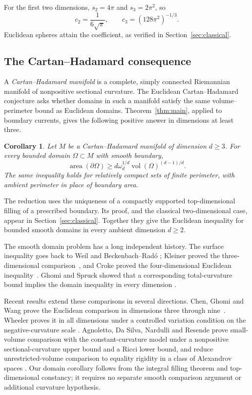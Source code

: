 \documentclass[11pt]{article}
\numberwithin{equation}{section}
\newtheorem{corollary}[theorem]{Corollary}
\theoremstyle{definition}
\theoremstyle{remark}
\begin{document}
For the first two dimensions, $s_2=4\pi$ and $s_3=2\pi^2$, so
\[
 c_2=\frac1{6\sqrt\pi},\qquad
 c_3=(128\pi^2)^{-1/3}.
\]
Euclidean spheres attain the coefficient, as verified in
Section~\ref{sec:classical}.

\subsection{The Cartan--Hadamard consequence}

A \emph{Cartan--Hadamard manifold} is a complete, simply connected
Riemannian manifold of nonpositive sectional curvature. The Euclidean
Cartan--Hadamard conjecture asks whether domains in such a manifold
satisfy the same volume--perimeter bound as Euclidean domains.
Theorem~\ref{thm:main}, applied to boundary currents, gives the
following positive answer in dimensions at least three.

\begin{corollary}\label{cor:cartan-hadamard}
Let $M$ be a Cartan--Hadamard manifold of dimension $d\ge3$.
For every bounded domain $\Omega\subset M$ with smooth boundary,
\begin{equation}\label{eq:classical}
 \operatorname{area}(\partial\Omega)
 \ge d\omega_d^{1/d}\operatorname{vol}(\Omega)^{(d-1)/d}.
\end{equation}
The same inequality holds for relatively compact sets of finite
perimeter, with ambient perimeter in place of boundary area.
\end{corollary}

The reduction uses the uniqueness of a compactly supported
top-dimensional filling of a prescribed boundary. Its proof, and the
classical two-dimensional case, appear in Section~\ref{sec:classical}.
Together they give the Euclidean inequality for bounded smooth domains
in every ambient dimension $d\ge2$.

The smooth domain problem has a long independent history. The surface
inequality goes back to Weil and Beckenbach--Rad\'o
\cite{Weil1926,BeckenbachRado1933}; Kleiner proved the
three-dimensional comparison~\cite{Kleiner1992}, and Croke proved
the four-dimensional Euclidean inequality~\cite{Croke1984}.
Ghomi and Spruck showed that a corresponding total-curvature bound
implies the domain inequality in every dimension
\cite[Theorem~7.1]{GhomiSpruck2022}.

Recent results extend these comparisons in several directions. Chen,
Ghomi and Wang prove the Euclidean comparison in dimensions three
through nine~\cite[Theorem~1.1]{ChenGhomiWang2026HigherDimensions}.
Wheeler proves it in all dimensions under a controlled variation
condition on the negative-curvature scale
\cite[Theorem~1.1 and Definition~1.2]{Wheeler2026}.
Agnoletto, Da Silva, Nardulli and Resende prove small-volume comparison
with the constant-curvature model under a nonpositive sectional-curvature
upper bound and a Ricci lower bound,
and reduce unrestricted-volume comparison to equality rigidity in a
class of Alexandrov spaces
\cite[Theorems~1.1 and~1.3; Assumption~1]{AgnolettoDaSilvaNardulliResende2026}.
Our domain corollary follows from the integral filling theorem and
top-dimensional constancy; it requires no separate smooth comparison
argument or additional curvature hypothesis.
\end{document}
